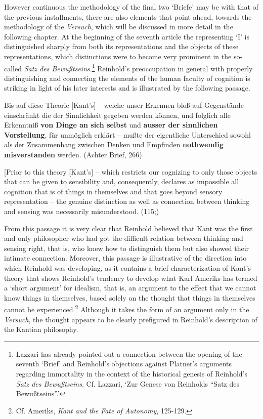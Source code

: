  However continuous the methodology of the final two `Briefe' may be with that of the previous installments, there are also elements that point ahead, towards the methodology of the \textit{Versuch}, which will be discussed in more detail in the following chapter. At the beginning of the seventh article the representing `I' is distinguished sharply from both its representations and the objects of these representations, which distinctions were to become very prominent in the so{-}called \textit{Satz des Bewu\ss{}tseins}.\footnote{ Lazzari has already pointed out a connection between the opening of the seventh `Brief' and Reinhold's objections against Platner's arguments regarding immortality in the context of the historical genesis of Reinhold's \textit{Satz des Bewu\ss{}tseins}. Cf. Lazzari, `Zur Genese von Reinholds ``Satz des Bewu\ss{}tseins''.' } Reinhold's preoccupation in general with properly distinguishing and connecting the elements of the human faculty of cognition is striking in light of his later interests and is illustrated by the following passage. 

Bis auf diese Theorie [Kant's] {--} welche unser Erkennen blo\ss{} auf Gegenst\"{a}nde einschr\"{a}nkt die der Sinnlichkeit gegeben werden k\"{o}nnen, und folglich alle Erkenntni\ss{} \textbf{von Dinge an sich selbst} und \textbf{ausser der sinnlichen Vorstellung}, f\"{u}r unm\"{o}glich erkl\"{a}rt {--} mu\ss{}te der eigentliche Unterschied sowohl als der Zusammenhang zwischen Denken und Empfinden \textbf{nothwendig misverstanden }werden. (Achter Brief, 266)

[Prior to this theory [Kant's] {--} which restricts our cognizing to only those objects that can be given to sensibility and, consequently, declares as impossible all cognition that is of things in themselves and that goes beyond sensory representation {--} the genuine distinction as well as connection between thinking and sensing was necessarily misunderstood. (115;)

From this passage it is very clear that Reinhold believed that Kant was the first and only philosopher who had got the difficult relation between thinking and sensing right, that is, who knew how to distinguish them but also showed their intimate connection. Moreover, this passage is illustrative of the direction into which Reinhold was developing, as it contains a brief characterization of Kant's theory that shows Reinhold's tendency to develop what Karl Ameriks has termed a `short argument' for idealism, that is, an argument to the effect that we cannot know things in themselves, based solely on the thought that things in themselves cannot be experienced.\footnote{ Cf. Ameriks, \textit{Kant and the Fate of Autonomy}, 125{-}129. } Although it takes the form of an argument only in the \textit{Versuch}, the thought appears to be clearly prefigured in Reinhold's description of the Kantian philosophy. 

